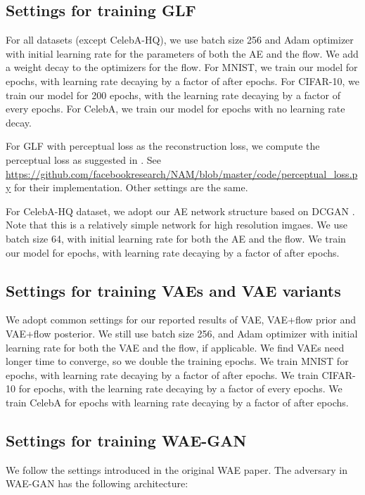 \documentclass{article}
\begin{document}
\subsection{Settings for training GLF} \label{AppB1}
For all datasets (except CelebA-HQ), we use batch size 256 and Adam \citep{adam} optimizer with initial learning rate  for the parameters of both the AE and the flow. We add a weight decay  to the optimizers for the flow. For MNIST, we train our model for  epochs, with learning rate decaying by a factor of  after  epochs. For CIFAR-10, we train our model for 200 epochs, with the learning rate decaying by a factor of  every  epochs. For CelebA, we train our model for  epochs with no learning rate decay. 

For GLF with perceptual loss as the reconstruction loss, we compute the perceptual loss as suggested in \citep{NAM}. See \url{https://github.com/facebookresearch/NAM/blob/master/code/perceptual_loss.py} for their implementation. Other settings are the same. 

For CelebA-HQ dataset, we adopt our AE network structure based on DCGAN \citep{DCGAN}. Note that this is a relatively simple network for high resolution imgaes. We use batch size 64, with initial learning rate  for both the AE and the flow. We train our model for  epochs, with learning rate decaying by a factor of  after  epochs. 


\subsection{Settings for training VAEs and VAE variants}
We adopt common settings for our reported results of VAE, VAE+flow prior and VAE+flow posterior. We still use batch size 256, and Adam optimizer with initial learning rate  for both the VAE and the flow, if applicable. We find VAEs need longer time to converge, so we double the training epochs. We train MNIST for  epochs, with learning rate decaying by a factor of  after  epochs. We train CIFAR-10 for  epochs, with the learning rate decaying by a factor of  every  epochs. We train CelebA for  epochs with learning rate decaying by a factor of  after  epochs. 

\subsection{Settings for training WAE-GAN}
We follow the settings introduced in the original WAE paper\citep{wae}. The adversary in WAE-GAN has the following architecture:
\end{document}
